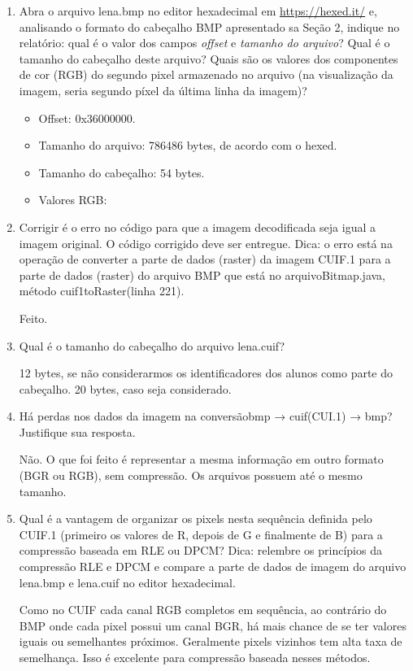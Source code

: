 \documentclass[12pt, a4paper, oneside]{abntex2}
\begin{document}
    \printcoverufsc

    \begin{enumerate}
        \item Abra o arquivo lena.bmp no editor hexadecimal em \href{https://hexed.it/}{https://hexed.it/} e, analisando o formato do cabeçalho BMP apresentado sa Seção 2, indique no relatório: qual é o valor dos campos \textit{offset} e \textit{tamanho do arquivo}?
            Qual é o tamanho do cabeçalho deste arquivo?
            Quais são os valores dos componentes de cor (RGB) do segundo pixel armazenado no arquivo (na visualização da imagem, seria segundo píxel da última linha da imagem)?

            \begin{itemize}
                \item Offset: 0x36000000.
                \item Tamanho do arquivo: 786486 bytes, de acordo com o hexed.
                \item Tamanho do cabeçalho: 54 bytes.
                \item Valores RGB: %
            \end{itemize}

        \item Corrigir é o erro no código para que a imagem decodificada seja igual a imagem original.
            O código corrigido deve ser entregue.
            Dica: o erro está na operação de converter a parte de dados (raster) da imagem CUIF.1 para a parte de dados (raster) do arquivo BMP que está no arquivoBitmap.java, método cuif1toRaster(linha 221).

            Feito.

        \item Qual é o tamanho do cabeçalho do arquivo lena.cuif?

                12 bytes, se não considerarmos os identificadores dos alunos como parte do cabeçalho.
                20 bytes, caso seja considerado.

        \item Há perdas nos dados da imagem na conversãobmp → cuif(CUI.1) → bmp?
                Justifique sua resposta.

                Não.
                O que foi feito é representar a mesma informação em outro formato (BGR ou RGB), sem compressão.
                Os arquivos possuem até o mesmo tamanho.

        \item Qual é a vantagem de organizar os pixels nesta sequência definida pelo CUIF.1 (primeiro os valores de R, depois de G e finalmente de B) para a compressão baseada em RLE ou DPCM? Dica: relembre os princípios da compressão RLE e DPCM e compare a parte de dados de imagem do arquivo lena.bmp e lena.cuif no editor hexadecimal.

                Como no CUIF cada canal RGB completos em sequência, ao contrário do BMP onde cada pixel possui um canal BGR, há mais chance de se ter valores iguais ou semelhantes próximos.
                Geralmente pixels vizinhos tem alta taxa de semelhança.
                Isso é excelente para compressão baseada nesses métodos.
    \end{enumerate}
\end{document}
